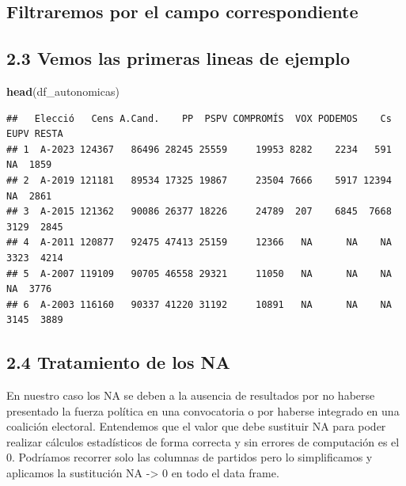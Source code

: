 \documentclass[
]{article}
\newenvironment{Shaded}{\begin{snugshade}}{\end{snugshade}}
\newcommand{\FunctionTok}[1]{\textcolor[rgb]{0.13,0.29,0.53}{\textbf{#1}}}
\newcommand{\NormalTok}[1]{#1}
\newcommand{\OtherTok}[1]{\textcolor[rgb]{0.56,0.35,0.01}{#1}}
\newcommand{\SpecialCharTok}[1]{\textcolor[rgb]{0.81,0.36,0.00}{\textbf{#1}}}
\newcommand{\StringTok}[1]{\textcolor[rgb]{0.31,0.60,0.02}{#1}}
\begin{document}
\hypertarget{filtraremos-por-el-campo-correspondiente}{%
\subsection{Filtraremos por el campo
correspondiente}\label{filtraremos-por-el-campo-correspondiente}}

\begin{Shaded}
\end{Shaded}

\hypertarget{vemos-las-primeras-lineas-de-ejemplo}{%
\subsection{2.3 Vemos las primeras lineas de
ejemplo}\label{vemos-las-primeras-lineas-de-ejemplo}}

\begin{Shaded}
\begin{Highlighting}[]
\FunctionTok{head}\NormalTok{(df\_autonomicas)}
\end{Highlighting}
\end{Shaded}

\begin{verbatim}
##   Elecció   Cens A.Cand.    PP  PSPV COMPROMÍS  VOX PODEMOS    Cs EUPV RESTA
## 1  A-2023 124367   86496 28245 25559     19953 8282    2234   591   NA  1859
## 2  A-2019 121181   89534 17325 19867     23504 7666    5917 12394   NA  2861
## 3  A-2015 121362   90086 26377 18226     24789  207    6845  7668 3129  2845
## 4  A-2011 120877   92475 47413 25159     12366   NA      NA    NA 3323  4214
## 5  A-2007 119109   90705 46558 29321     11050   NA      NA    NA   NA  3776
## 6  A-2003 116160   90337 41220 31192     10891   NA      NA    NA 3145  3889
\end{verbatim}

\hypertarget{tratamiento-de-los-na}{%
\subsection{2.4 Tratamiento de los NA}\label{tratamiento-de-los-na}}

En nuestro caso los NA se deben a la ausencia de resultados por no
haberse presentado la fuerza política en una convocatoria o por haberse
integrado en una coalición electoral. Entendemos que el valor que debe
sustituir NA para poder realizar cálculos estadísticos de forma correcta
y sin errores de computación es el 0. Podríamos recorrer solo las
columnas de partidos pero lo simplificamos y aplicamos la sustitución NA
-\textgreater{} 0 en todo el data frame.
\end{document}
